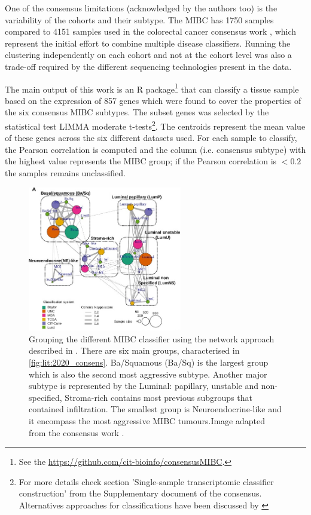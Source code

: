 One of the consensus limitations (acknowledged by the authors too) is the variability of the cohorts and their subtype. The MIBC has 1750 samples compared to 4151 samples used in the colorectal cancer consensus work \cite{Guinney2015-fy}, which represent the initial effort to combine multiple disease classifiers. Running the clustering independently on each cohort and not at the cohort level was also a trade-off required by the different sequencing technologies present in the data. 

The main output of this work is an R package\footnote{See the \url{https://github.com/cit-bioinfo/consensusMIBC}.} that can classify a tissue sample based on the expression of 857 genes which were found to cover the properties of the six consensus MIBC subtypes. The subset genes was selected by the statistical test LIMMA moderate t-tests\footnote{For more details check section 'Single-sample transcriptomic classifier construction' from the Supplementary document of the consensus. Alternatives approaches for classifications have been discussed by \citet{Eriksson2022-vw}}. The centroids represent the mean value of these genes across the six different datasets used. For each sample to classify, the Pearson correlation is computed and the column (i.e. consensus subtype) with the highest value represents the MIBC group; if the Pearson correlation is $<0.2$ the samples remains unclassified. 

\begin{figure}[!htb]    
    \centering
\includegraphics[width=0.6\textwidth,height=0.6\textheight,keepaspectratio]{Sections/Lit_review/Resources/consensus_network_classifier.jpg}
    \caption{Grouping the different MIBC classifier using the network approach described in \cite{Guinney2015-fy}. There are six main groups, characterised in \cref{fig:lit:2020_consens}. Ba/Squamous (Ba/Sq) is the largest group which is also the second most aggressive subtype. Another major subtype is represented by the Luminal: papillary, unstable and non-specified, Stroma-rich contains most previous subgroups that contained infiltration. The smallest group is Neuroendocrine-like and it encompass the most aggressive MIBC tumours.Image adapted from the consensus work \citet{Kamoun2020-tj}.}
    \label{fig:lit:consensus_network}
\end{figure}


